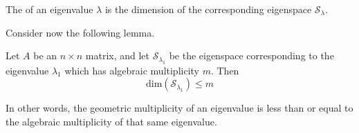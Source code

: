 \documentclass{ximera}
\begin{document}
\begin{definition}\label{def:geommulteig}
The  of an eigenvalue $\lambda$ is the dimension of the corresponding eigenspace $\mathcal{S}_\lambda$.
\end{definition}

Consider now the following lemma.

\begin{lemma}\label{lemma:dimeigenspace}
Let $A$ be an $n\times n$ matrix, and let $\mathcal{S}_{\lambda_1}$ be the eigenspace corresponding to the eigenvalue $\lambda_1$ which has algebraic multiplicity $m$.  Then
$$\mbox{dim}(\mathcal{S}_{\lambda_1})\leq m$$
\end{lemma}

In other words, the geometric multiplicity of an eigenvalue is less than or equal to the algebraic multiplicity of that same eigenvalue.
\end{document}
